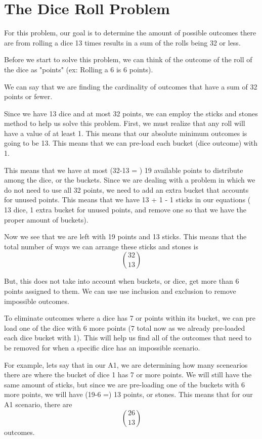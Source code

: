 \documentclass[11pt]{article}
\begin{document}
\section{The Dice Roll Problem}

For this problem, our goal is to determine the amount of possible outcomes there are from rolling a dice 13 times results in a sum of the rolls being 32 or less. 

Before we start to solve this problem, we can think of the outcome of the roll of the dice as "points" (ex: Rolling a 6 is 6 points).

We can say that we are finding the cardinality of outcomes that have a sum of 32 points or fewer.

Since we have 13 dice and at most 32 points, we can employ the sticks and stones method to help us solve this problem. First, we must realize that any roll will have a value of at least 1. This means that our absolute minimum outcomes is going to be 13. This means that we can pre-load each bucket (dice outcome) with 1. 

This means that we have at most (32-13 = ) 19 available points to distribute among the dice, or the buckets. Since we are dealing with a problem in which we do not need to use all 32 points, we need to add an extra bucket that accounts for unused points. This means that we have 13 + 1 - 1 sticks in our equations ( 13 dice, 1 extra bucket for unused points, and remove one so that we have the proper amount of buckets).

Now we see that we are left with 19 points and 13 sticks. This means that the total number of ways we can arrange these sticks and stones is  
$$\binom{32}{13}$$

But, this does not take into account when buckets, or dice, get more than 6 points assigned to them. We can use use inclusion and exclusion to remove impossible outcomes. 

To eliminate outcomes where a dice has 7 or points within its bucket, we can pre load one of the dice with 6 more points (7 total now as we already pre-loaded each dice bucket with 1). This will help us find all of the outcomes that need to be removed for when a specific dice has an impossible scenario. 

For example, lets say that in our A1, we are determining how many scenearios there are where the bucket of dice 1 has 7 or more points. We will still have the same amount of sticks, but since we are pre-loading one of the buckets with 6 more points, we will have (19-6 =) 13 points, or stones. This means that for our A1 scenario, there are  
$$\binom{26}{13}$$
outcomes. 
\end{document}
